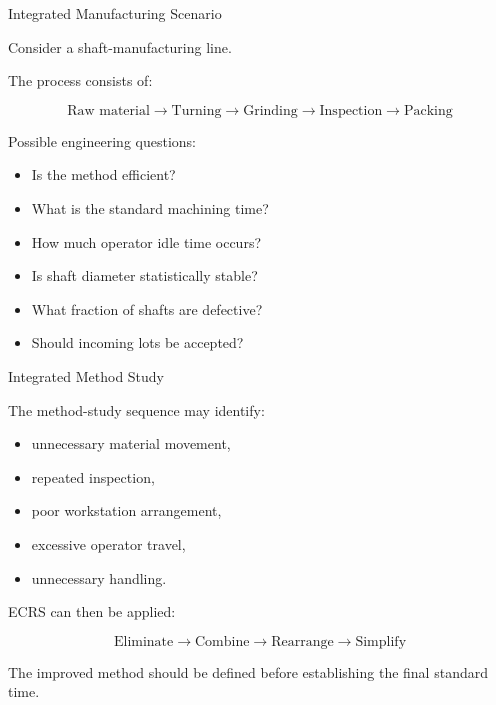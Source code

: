 \documentclass[aspectratio=169,10pt]{beamer}
\begin{document}
\begin{frame}[shrink=18]{Integrated Manufacturing Scenario}
\small

Consider a shaft-manufacturing line.

The process consists of:

\[
\text{Raw material}
\rightarrow
\text{Turning}
\rightarrow
\text{Grinding}
\rightarrow
\text{Inspection}
\rightarrow
\text{Packing}
\]

Possible engineering questions:

\begin{itemize}
    \item Is the method efficient?
    \item What is the standard machining time?
    \item How much operator idle time occurs?
    \item Is shaft diameter statistically stable?
    \item What fraction of shafts are defective?
    \item Should incoming lots be accepted?
\end{itemize}

\end{frame}


\begin{frame}[shrink=18]{Integrated Method Study}
\small

The method-study sequence may identify:

\begin{itemize}
    \item unnecessary material movement,
    \item repeated inspection,
    \item poor workstation arrangement,
    \item excessive operator travel,
    \item unnecessary handling.
\end{itemize}

ECRS can then be applied:

\[
\boxed{
\text{Eliminate}
\rightarrow
\text{Combine}
\rightarrow
\text{Rearrange}
\rightarrow
\text{Simplify}
}
\]

The improved method should be defined before establishing
the final standard time.

\end{frame}

\end{document}
